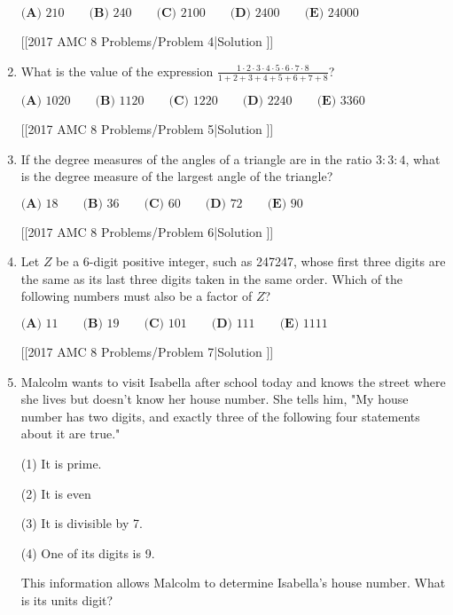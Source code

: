 \documentclass{article}
\begin{document}
\begin{enumerate}[label=\arabic*., itemsep=0.5em]
\(\textbf{(A) }210\qquad\textbf{(B) }240\qquad\textbf{(C) }2100\qquad\textbf{(D) }2400\qquad\textbf{(E) }24000\)

[[2017 AMC 8 Problems/Problem 4|Solution
]]\par \vspace{0.5em}\item What is the value of the expression \(\frac{1 \cdot 2 \cdot 3 \cdot 4 \cdot 5 \cdot 6 \cdot 7 \cdot 8}{1+2+3+4+5+6+7+8}\)?

\(\textbf{(A) }1020\qquad\textbf{(B) }1120\qquad\textbf{(C) }1220\qquad\textbf{(D) }2240\qquad\textbf{(E) }3360\)

[[2017 AMC 8 Problems/Problem 5|Solution
]]\par \vspace{0.5em}\item If the degree measures of the angles of a triangle are in the ratio \(3:3:4\), what is the degree measure of the largest angle of the triangle?

\(\textbf{(A) }18\qquad\textbf{(B) }36\qquad\textbf{(C) }60\qquad\textbf{(D) }72\qquad\textbf{(E) }90\)

[[2017 AMC 8 Problems/Problem 6|Solution
]]\par \vspace{0.5em}\item Let \(Z\) be a 6-digit positive integer, such as 247247, whose first three digits are the same as its last three digits taken in the same order. Which of the following numbers must also be a factor of \(Z\)?

\(\textbf{(A) }11\qquad\textbf{(B) }19\qquad\textbf{(C) }101\qquad\textbf{(D) }111\qquad\textbf{(E) }1111\)

[[2017 AMC 8 Problems/Problem 7|Solution
]]\par \vspace{0.5em}\item Malcolm wants to visit Isabella after school today and knows the street where she lives but doesn't know her house number. She tells him, "My house number has two digits, and exactly three of the following four statements about it are true."

(1) It is prime.

(2) It is even

(3) It is divisible by 7.

(4) One of its digits is 9.

This information allows Malcolm to determine Isabella's house number. What is its units digit?


\end{enumerate}
\end{document}
